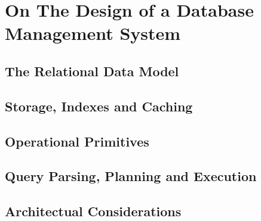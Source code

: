 \chapter{On The Design of a Database Management System}
\label{chapter:theory_databases}


\section{The Relational Data Model}
\label{section:relational_data_model}

\section{Storage, Indexes and Caching}

\section{Operational Primitives}

\section{Query Parsing, Planning and Execution}

\section{Architectual Considerations}